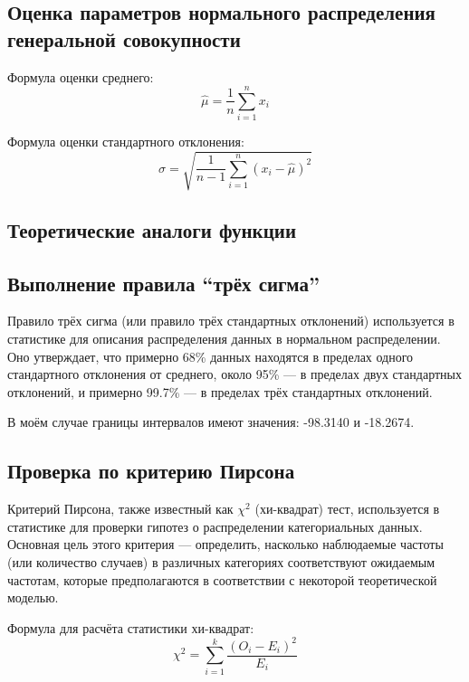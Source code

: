 \subsection*{Оценка параметров нормального распределения генеральной совокупности}

Формула оценки среднего:
\[\hat{\mu} = \frac{1}{n} \sum_{i=1}^{n} x_i\]

Формула оценки стандартного отклонения:
\[\hat{\sigma} = \sqrt{\frac{1}{n-1} \sum_{i=1}^{n} (x_i - \hat{\mu})^2}\]

\subsection*{Теоретические аналоги функции}

\subsection*{Выполнение правила \enquote{трёх сигма}}

Правило трёх сигма (или правило трёх стандартных отклонений) используется в статистике для описания распределения данных в нормальном распределении. Оно утверждает, что примерно 68\% данных находятся в пределах одного стандартного отклонения от среднего, около 95\% — в пределах двух стандартных отклонений, и примерно 99.7\% — в пределах трёх стандартных отклонений.

В моём случае границы интервалов имеют значения: -98.3140 и -18.2674.

\subsection*{Проверка по критерию Пирсона}

Критерий Пирсона, также известный как $\chi^2$ (хи-квадрат) тест, используется в статистике для проверки гипотез о распределении категориальных данных. Основная цель этого критерия — определить, насколько наблюдаемые частоты (или количество случаев) в различных категориях соответствуют ожидаемым частотам, которые предполагаются в соответствии с некоторой теоретической моделью.

Формула для расчёта статистики хи-квадрат:
\[ \chi^2 = \sum_{i=1}^{k} \frac{(O_i - E_i)^2}{E_i} \]

\begin{spacing}{1.0}
    
\end{spacing}

